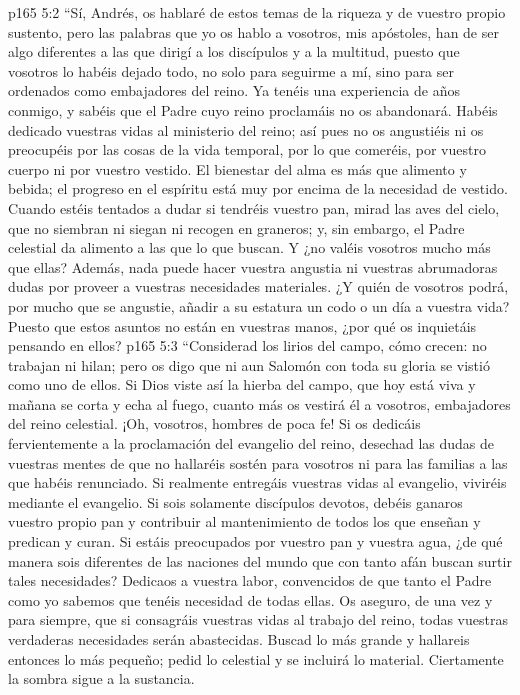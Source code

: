 \vs p165 5:2 \pc “Sí, Andrés, os hablaré de estos temas de la riqueza y de vuestro propio sustento, pero las palabras que yo os hablo a vosotros, mis apóstoles, han de ser algo diferentes a las que dirigí a los discípulos y a la multitud, puesto que vosotros lo habéis dejado todo, no solo para seguirme a mí, sino para ser ordenados como embajadores del reino. Ya tenéis una experiencia de años conmigo, y sabéis que el Padre cuyo reino proclamáis no os abandonará. Habéis dedicado vuestras vidas al ministerio del reino; así pues no os angustiéis ni os preocupéis por las cosas de la vida temporal, por lo que comeréis, por vuestro cuerpo ni por vuestro vestido. El bienestar del alma es más que alimento y bebida; el progreso en el espíritu está muy por encima de la necesidad de vestido. Cuando estéis tentados a dudar si tendréis vuestro pan, mirad las aves del cielo, que no siembran ni siegan ni recogen en graneros; y, sin embargo, el Padre celestial da alimento a las que lo que buscan. Y ¿no valéis vosotros mucho más que ellas? Además, nada puede hacer vuestra angustia ni vuestras abrumadoras dudas por proveer a vuestras necesidades materiales. ¿Y quién de vosotros podrá, por mucho que se angustie, añadir a su estatura un codo o un día a vuestra vida? Puesto que estos asuntos no están en vuestras manos, ¿por qué os inquietáis pensando en ellos?
\vs p165 5:3 “Considerad los lirios del campo, cómo crecen: no trabajan ni hilan; pero os digo que ni aun Salomón con toda su gloria se vistió como uno de ellos. Si Dios viste así la hierba del campo, que hoy está viva y mañana se corta y echa al fuego, cuanto más os vestirá él a vosotros, embajadores del reino celestial. ¡Oh, vosotros, hombres de poca fe! Si os dedicáis fervientemente a la proclamación del evangelio del reino, desechad las dudas de vuestras mentes de que no hallaréis sostén para vosotros ni para las familias a las que habéis renunciado. Si realmente entregáis vuestras vidas al evangelio, viviréis mediante el evangelio. Si sois solamente discípulos devotos, debéis ganaros vuestro propio pan y contribuir al mantenimiento de todos los que enseñan y predican y curan. Si estáis preocupados por vuestro pan y vuestra agua, ¿de qué manera sois diferentes de las naciones del mundo que con tanto afán buscan surtir tales necesidades? Dedicaos a vuestra labor, convencidos de que tanto el Padre como yo sabemos que tenéis necesidad de todas ellas. Os aseguro, de una vez y para siempre, que si consagráis vuestras vidas al trabajo del reino, todas vuestras verdaderas necesidades serán abastecidas. Buscad lo más grande y hallareis entonces lo más pequeño; pedid lo celestial y se incluirá lo material. Ciertamente la sombra sigue a la sustancia.
